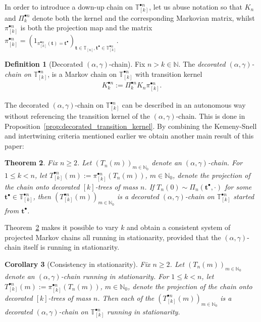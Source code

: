 \documentclass[a4paper, final]{amsart}
\theoremstyle{plain}
\newtheorem{thm}{Theorem}[section]
\newtheorem{cor}[thm]{Corollary}
\theoremstyle{definition}
\newtheorem{defi}[thm]{Definition}
\newcommand{\tree}[1][t]{\boldsymbol{#1}}
\newcommand{\T}{\mathbb{T}}
\newcommand{\N}{\mathbb{N}}
\begin{document}
In order to introduce a down-up chain on $\T_{[k]}^{\bullet n}$, let us abuse notation so that $K_n$ and $\Pi_k^{\bullet n}$ denote both the kernel and the corresponding Markovian matrix, whilst $\pi_{[k]}^{\bullet n}$ is both the projection map and the matrix $\pi_{[k]}^{\bullet n} = {\left( 1_{\pi_{[k]}^{\bullet n} ( \tree ) = \tree^\bullet} \right)}_{\tree \in \T_{[n]}, \tree^\bullet \in \T_{[k]}^{\bullet n}}$.
%
\begin{defi}[Decorated $(\alpha, \gamma)$-chain]%
  \label{def:decorated_alphagamma_chain_intro}
  Fix $n > k \in \N$.
  The \textit{decorated $(\alpha, \gamma)$-chain on} $\T_{[k]}^{\bullet n}$, is a Markov chain on $\T_{[k]}^{\bullet n}$ with transition kernel
  \begin{align}
    K_k^{\bullet n} := \Pi_k^{\bullet n} K_n \pi_{[k]}^{\bullet n}.
    \label{eq:transitionkernel_decorated_intro}
  \end{align}
\end{defi}
%
The decorated $(\alpha, \gamma)$-chain on $\T_{[k]}^{\bullet n}$ can be described in an autonomous way without referencing the transition kernel of the $(\alpha, \gamma)$-chain.
This is done in Proposition~\ref{prop:decorated_transition_kernel}.
By combining the Kemeny-Snell and intertwining criteria mentioned earlier we obtain another main result of this paper:
%
\begin{thm}\label{thm:projection_decorated_chain}
  Fix $n \geq 2$.
  Let ${\left( T_n(m) \right)}_{m \in \N_0}$ denote an $(\alpha, \gamma)$-chain.
  For $1 \leq k < n$, let $T_{[k]}^{\bullet n}(m) := \pi_{[k]}^{\bullet n} \left( T_n(m) \right)$, $m \in \N_0$, denote the projection of the chain onto decorated $[k]$-trees of mass $n$.
  If $T_n(0) \sim \Pi_n (\tree^\bullet, \cdot)$ for some $\tree^\bullet \in \T_{[k]}^{\bullet n}$, then ${\left( T_{[k]}^{\bullet n}( m ) \right)}_{m \in \N_0}$ is a decorated $(\alpha, \gamma)$-chain on $\T_{[k]}^{\bullet n}$ started from $\tree^\bullet$.
\end{thm}
%
Theorem~\ref{thm:projection_decorated_chain} makes it possible to vary $k$ and obtain a consistent system of projected Markov chains all running in stationarity, provided that the $(\alpha, \gamma)$-chain itself is running in stationarity.
%
\begin{cor}[Consistency in stationarity]%
  \label{cor:consistency_stationarity}
  Fix $n \geq 2$.
  Let ${\left( T_n(m) \right)}_{m \in \N_0}$ denote an $(\alpha, \gamma)$-chain running in stationarity.
  For $1 \leq k < n$, let $T_{[k]}^{\bullet n}(m) := \pi_{[k]}^{\bullet n} \left( T_n(m) \right)$, $m \in \N_0$, denote the projection of the chain onto decorated $[k]$-trees of mass $n$.
  Then each of the ${\left( T_{[k]}^{\bullet n}(m) \right)}_{m \in \N_0}$ is a decorated $(\alpha ,\gamma)$-chain on $\T_{[k]}^{\bullet n}$ running in stationarity.
\end{cor}
\end{document}
